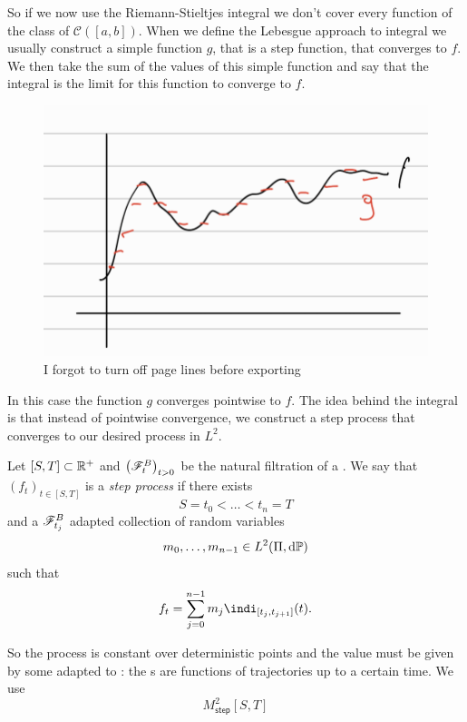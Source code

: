 \documentclass[12pt]{report}
\begin{document}
So if we now use the Riemann-Stieltjes integral we don't cover every function of the class of $\mathcal{C}([a,b])$. When we define the Lebesgue approach to integral we usually construct a simple function $g$, that is a step function, that converges to $f$. We then take the sum of the values of this simple function and say that the integral is the limit for this function to converge to $f$.
\begin{figure}[h]
	\centering
	\includegraphics[width=0.7\linewidth]{img/screenshot002}
	\caption{I forgot to turn off page lines before exporting}
	\label{fig:screenshot002}
\end{figure}
In this case the function $g$ converges pointwise to $f$. The idea behind the \ito{} integral is that instead of pointwise convergence, we construct a step process that converges to our desired process in $L^{2}$. 
\begin{definition}
	Let $[S,T]\subset\mathbb{R}^{+}$ and ${\left(\mathscr{F}^{B}_{t}\right)}_{t>0}$ be the natural filtration of a \bwm. We say that ${(f_{t})}_{t\in[S,T]}$ is a \emph{step process} if there exists
	\begin{equation*}
		S=t_{0}<\ldots<t_{n}=T
	\end{equation*}
	and a $\mathscr{F}^{B}_{t_{j}}$ adapted collection of random variables
	\begin{equation*}
		m_{0},\ldots,m_{n-1}\in L^{2}(\Pi,\mathop{}\!\mathrm{d}\mathbb{P})
	\end{equation*}
	such that
	\begin{equation*}
		f_{t}=\sum_{j=0}^{n-1}m_{j}\indi_{[t_{j},t_{j+1}]}(t).
	\end{equation*}
\end{definition}
So the process is constant over deterministic points and the value must be given by some \rv{} adapted to \bwm: the \rv s are functions of \bwm{} trajectories up to a certain time.
We use 
\begin{equation*}
	M^{2}_{\mathsf{step}}[S,T]
\end{equation*}
\end{document}
